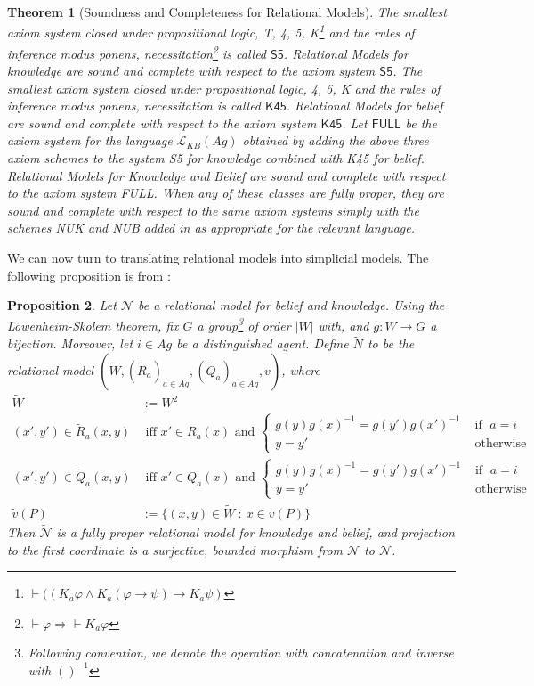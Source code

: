 \documentclass[11pt]{article}
\newtheorem{theorem}{Theorem}[section]
\newtheorem{proposition}[theorem]{Proposition}
\theoremstyle{definition}
\renewcommand{\L}{\mathcal{L}}
\newcommand{\N}{\mathcal{N}}
\newcommand{\full}{\textsf{FULL}}
\begin{document}
	\begin{theorem}[Soundness and Completeness for Relational Models]
	The smallest axiom system closed under propositional logic, \textsf{T}, \textsf{4}, \textsf{5}, \textsf{K}\footnote{$\vdash ((K_a\varphi\wedge K_a(\varphi\rightarrow\psi)\rightarrow K_a\psi)$} and the rules of inference modus ponens, necessitation\footnote{$\vdash \varphi\Rightarrow\vdash K_a\varphi$} is called $\textsf{S5}$. Relational Models for knowledge are sound and complete with respect to the axiom system $\textsf{S5}$. The smallest axiom system closed under propositional logic, \textsf{4}, \textsf{5}, \textsf{K} and the rules of inference modus ponens, necessitation is called $\textsf{K45}$. Relational Models for belief are sound and complete with respect to the axiom system $\textsf{K45}$. Let $\full$ be the axiom system for the language $\L_{KB}(Ag)$ obtained by adding the above three axiom schemes to the system \textsf{S5} for knowledge combined with \textsf{K45} for belief. Relational Models for Knowledge and Belief are sound and complete with respect to the axiom system \full. When any of these classes are fully proper, they are sound and complete with respect to the same axiom systems simply with the schemes \textsf{NUK} and \textsf{NUB} added in as appropriate for the relevant language.
	\end{theorem}

	We can now turn to translating relational models into simplicial models. The following proposition is from \cite{BelSimp}:
	
	\begin{proposition}
		Let $\N$ be a relational model for belief and knowledge. Using the L\"owenheim-Skolem theorem, fix $G$ a group\footnote{Following convention, we denote the operation with concatenation and inverse with $()^{-1}$} of order $|W|$ with, and $g:W\rightarrow G$ a bijection. Moreover, let $i\in Ag$ be a distinguished agent. Define $\tilde{N}$ to be the relational model $(\tilde{W}, (\tilde{R}_a)_{a\in Ag}, (\tilde{Q}_a)_{a\in Ag}, v)$, where
		\begin{align*}
		\tilde{W}&:=W^2\\
		(x',y')\in\tilde{R}_a(x,y)&\text{ iff }x'\in R_a(x)\text{ and } \begin{cases}
		g(y)g(x)^{-1} = g(y')g(x')^{-1}& \text{ if }\;a=i\\
		y=y'& \text{ otherwise}
		\end{cases}\\
		(x',y')\in\tilde{Q}_a(x,y)&\text{ iff }x'\in Q_a(x)\text{ and } \begin{cases}
			g(y)g(x)^{-1} = g(y')g(x')^{-1}& \text{ if }\;a=i\\
			y=y'& \text{ otherwise}
		\end{cases}\\
	\tilde{v}(P)&:=\{(x,y) \in \tilde{W} \: : \: x \in v(P)\}
		\end{align*}
		Then $\tilde{\N}$ is a fully proper relational model for knowledge and belief, and projection to the first coordinate is a surjective, bounded morphism from $\tilde{\N}$ to $\N$.
	\end{proposition}
\end{document}
